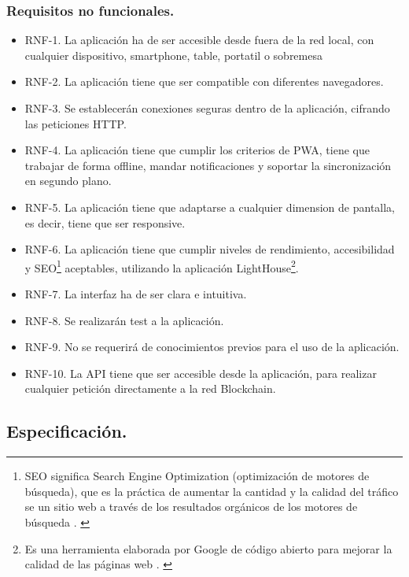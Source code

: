 \subsubsection{Requisitos no funcionales.}

\begin{itemize}
    \item[] RNF-1. La aplicación ha de ser accesible desde fuera de la red local, con cualquier dispositivo, smartphone, 
    table, portatil o sobremesa
    \item[] RNF-2. La aplicación tiene que ser compatible con diferentes navegadores.
    \item[] RNF-3. Se establecerán conexiones seguras dentro de la aplicación, cifrando las peticiones HTTP.
    \item[] RNF-4. La aplicación tiene que cumplir los criterios de PWA, tiene que trabajar de forma offline, mandar
    notificaciones y soportar la sincronización en segundo plano.
    \item[] RNF-5. La aplicación tiene que adaptarse a cualquier dimension de pantalla, es decir, tiene que ser responsive.
    \item[] RNF-6. La aplicación tiene que cumplir niveles de rendimiento, accesibilidad y SEO\footnote{ SEO significa 
    Search Engine Optimization (optimización de motores de búsqueda), que es la práctica de aumentar la cantidad y la 
    calidad del tráfico se un sitio web a través de los resultados orgánicos de los motores de búsqueda \cite{what-is-seo}. 
    \label{fnlabel}} aceptables, utilizando la aplicación LightHouse\footnote{ Es una herramienta elaborada por Google de 
    código abierto para mejorar la calidad de las páginas web \cite{lighthouse}. \label{fnlabel}}.
    \item[] RNF-7. La interfaz ha de ser clara e intuitiva.
    \item[] RNF-8. Se realizarán test a la aplicación.
    \item[] RNF-9. No se requerirá de conocimientos previos para el uso de la aplicación.
    \item[] RNF-10. La API tiene que ser accesible desde la aplicación, para realizar cualquier petición directamente
    a la red Blockchain.
\end{itemize}

\subsection{Especificación.}

